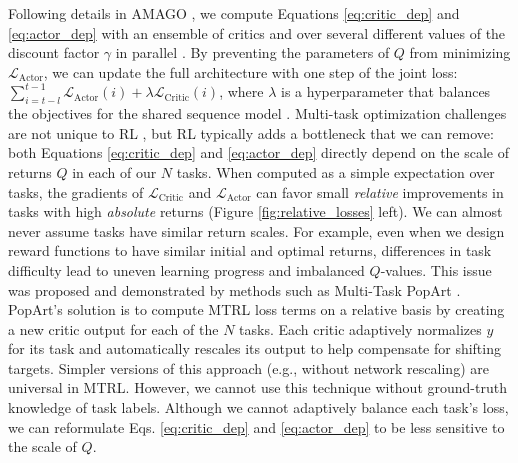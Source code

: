 \documentclass{article}
\begin{document}
Following details in AMAGO \cite{grigsby2024amago}, we compute Equations \eqref{eq:critic_dep} and \eqref{eq:actor_dep} with an ensemble of critics \cite{chen2021randomized} and over several different values of the discount factor $\gamma$ in parallel \cite{fedus2019hyperbolic}. By preventing the parameters of $Q$ from minimizing $\mathcal{L}_{\text{Actor}}$, we can update the full architecture with one step of the joint loss: $\sum_{i = t-l}^{t-1}\mathcal{L}_{\text{Actor}}(i) + \lambda \mathcal{L}_{\text{Critic}}(i)$, where $\lambda$ is a hyperparameter that balances the objectives for the shared sequence model \cite{ni2023transformers, grigsby2024amago}.
Multi-task optimization challenges are not unique to RL \cite{shaham2023causes, royer2024scalarization}, but RL typically adds a bottleneck that we can remove: both Equations \eqref{eq:critic_dep} and \eqref{eq:actor_dep} directly depend on the scale of returns $Q$ in each of our $N$ tasks. When computed as a simple expectation over tasks, the gradients of $\mathcal{L}_{\text{Critic}}$ and $\mathcal{L}_{\text{Actor}}$ can favor small \textit{relative} improvements in tasks with high \textit{absolute} returns (Figure \ref{fig:relative_losses} left). We can almost never assume tasks have similar return scales. For example, even when we design reward functions to have similar initial and optimal returns, differences in task difficulty lead to uneven learning progress and imbalanced $Q$-values. This issue was proposed and demonstrated by methods such as Multi-Task PopArt \cite{hessel2019multi}. PopArt's solution is to compute MTRL loss terms on a relative basis by creating a new critic output for each of the $N$ tasks. Each critic adaptively normalizes $y$ for its task and automatically rescales its output to help compensate for shifting targets. Simpler versions of this approach (e.g., without network rescaling) are universal in MTRL. However, we cannot use this technique without ground-truth knowledge of task labels. Although we cannot adaptively balance each task's loss, we can reformulate Eqs. \eqref{eq:critic_dep} and \eqref{eq:actor_dep} to be less sensitive to the scale of $Q$.
\end{document}
